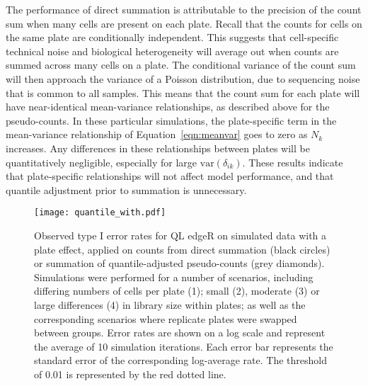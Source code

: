 \documentclass{article}
\begin{document}
The performance of direct summation is attributable to the precision of the count sum when many cells are present on each plate.
Recall that the counts for cells on the same plate are conditionally independent. 
This suggests that cell-specific technical noise and biological heterogeneity will average out when counts are summed across many cells on a plate.
The conditional variance of the count sum will then approach the variance of a Poisson distribution, due to sequencing noise \cite{marioni2008rnaseq} that is common to all samples.
This means that the count sum for each plate will have near-identical mean-variance relationships, as described above for the pseudo-counts.
In these particular simulations, the plate-specific term in the mean-variance relationship of Equation~\ref{eqn:meanvar} goes to zero as $N_k$ increases.
Any differences in these relationships between plates will be quantitatively negligible, especially for large $\mbox{var}(\delta_{ik})$.
These results indicate that plate-specific relationships will not affect model performance, and that quantile adjustment prior to summation is unnecessary.

\begin{figure}[tbp]
\begin{center}
\texttt{[image: quantile\_with.pdf]}
\end{center}
\caption{
    Observed type I error rates for QL edgeR on simulated data with a plate effect, 
        applied on counts from direct summation (black circles) or summation of quantile-adjusted pseudo-counts (grey diamonds). 
    Simulations were performed for a number of scenarios, including differing numbers of cells per plate (1);
        small (2), moderate (3) or large differences (4) in library size within plates;
        as well as the corresponding scenarios where replicate plates were swapped between groups.
    Error rates are shown on a log scale and represent the average of 10 simulation iterations.
    Each error bar represents the standard error of the corresponding log-average rate.
    The threshold of 0.01 is represented by the red dotted line.
}
\label{fig:complexplate}
\end{figure}

\end{document}

